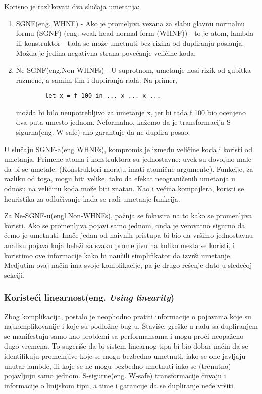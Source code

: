 Korisno je razlikovati dva slučaja umetanja:
\begin{enumerate}
	\item SGNF(eng. WHNF) - Ako je promeljiva vezana za slabu glavnu normalnu formu (SGNF) (eng. weak head normal form (WHNF)) - to 
	je atom, lambda ili konstruktor - tada se može umetnuti bez rizika od dupliranja poslanja. Možda je jedina negativna 
	strana povećanje veličine koda.
	\item Ne-SGNF(eng.Non-WHNFs) - U suprotnom, umetanje nosi rizik od gubitka razmene, a samim tim i dupliranja rada. Na primer,
		\begin{verbatim}
		let x = f 100 in ... x ... x ... 
		\end{verbatim}
	možda bi bilo neupotrebljivo za umetanje x, jer bi tada f 100 bio ocenjeno dva puta 
	umesto jednom. Neformalno, kažemo da je transformacija S-sigurna(eng. W-safe) ako garantuje da ne duplira posao.
\end{enumerate}

U slučaju SGNF-a(eng WHNFs), kompromis je između veličine koda i koristi od umetanja. Primene atoma i konstruktora su 
jednostavne: uvek su dovoljno male da bi se umetale. (Konstruktori moraju imati atomične argumente). Funkcije, za 
razliku od toga, mogu biti velike, tako da efekat neograničenih umetanja u odnosu na veličinu koda može biti znatan. Kao i većina 
kompajlera, koristi se heuristika za odlučivanje kada se radi umetanje funkcija. 

Za Ne-SGNF-u(engl.Non-WHNFs), pažnja se fokusira na to kako se promenljiva koristi. Ako se promenljiva 
pojavi samo jednom, onda je verovatno sigurno da ćemo je umetnuti. Inače jedan od naivnih pristupa bi bio da vršimo jednostavnu analizu pojava koja 
beleži za svaku promeljivu na koliko mesta se koristi, i koristimo ove informacije kako bi naučili simplifikator da izvrši umetanje. Medjutim ovaj način ima svoje komplikacije, pa je drugo rešenje dato u sledećoj sekciji.

\subsubsection{ Koristeći linearnost(eng. \emph{Using linearity})}
\label{sec:podpodnaslovLinearity}

Zbog komplikacija, postalo je neophodno pratiti informacije o pojavama koje su najkomplikovanije i koje su podložne bug-u. Štaviše, 
greške u radu sa dupliranjem se manifestuju samo kao problemi sa performansama i mogu proći neopaženo dugo vremena. To sugeriše da bi sistem linearnog tipa bi bio dobar način da se identifikuju promelnjive koje se mogu bezbedno umetnuti, iako se one javljaju unutar lambde, ili koje se ne mogu bezbedno umetnuti iako se (trenutno) pojavljuju samo jednom. S-sigurne(eng. W-safe) transformacije čuvaju i informacije o linijskom tipu, a time i garancije da se dupliranje neće vršiti.

